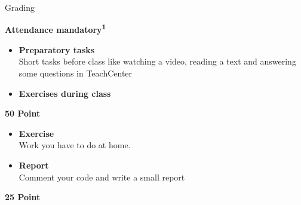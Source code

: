 \documentclass[aspectratio=169]{beamer}
\begin{document}
\begin{frame}{Grading}
    \begin{coloredblock}[turquoise]
        \centering\footnotesize\textbf{Attendance mandatory\textsuperscript{1}}
    \end{coloredblock}

    \vspace{-0.5cm}
    \begin{minipage}[t][9.5cm]{\textwidth}
        \begin{minipage}[t]{0.32\textwidth}
            \begin{coloredblock}
                \begin{itemize}
                    \item \footnotesize \textbf{Preparatory tasks}\\
                    Short tasks before class like watching a video, reading a text and answering some questions in TeachCenter
                    \item \footnotesize \textbf{Exercises during class}
                \end{itemize}
            \end{coloredblock}
            \centering \footnotesize \textbf{50 Point}
        \end{minipage}
        \hfill
        \begin{minipage}[t]{0.32\textwidth}
            \begin{coloredblock}
                \begin{itemize}
                    \item \footnotesize \textbf{Exercise}\\
                    Work you have to do at home.
                    \item \footnotesize \textbf{Report}\\
                    Comment your code and write a small report
                \end{itemize}
            \end{coloredblock}
            \centering \footnotesize \textbf{25 Point}
        \end{minipage}
        \hfill
        \begin{minipage}[t]{0.32\textwidth}
            \begin{coloredblock}
                \begin{itemize}

\end{itemize}
\end{coloredblock}
\end{minipage}
\end{minipage}
\end{frame}
\end{document}
